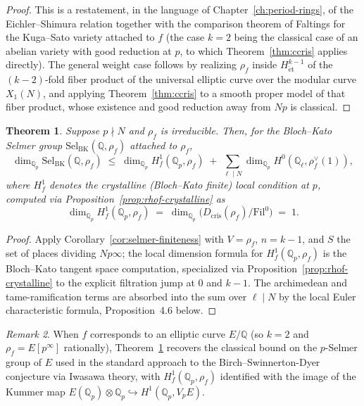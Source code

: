 \documentclass[10pt]{amsbook}
\newtheorem{theorem}{Theorem}[chapter]
\theoremstyle{definition}
\theoremstyle{remark}
\newtheorem{remark}[theorem]{Remark}
\newcommand{\Qp}{\mathbb{Q}_p}
\begin{document}
\begin{proof}
This is a restatement, in the language of Chapter~\ref{ch:period-rings}, of the
Eichler--Shimura relation together with the comparison theorem of Faltings for the Kuga--Sato
variety attached to $f$ (the case $k=2$ being the classical case of an abelian variety with
good reduction at $p$, to which Theorem~\ref{thm:ccris} applies directly). The general weight
case follows by realizing $\rho_f$ inside $H^{k-1}_{\mathrm{\acute et}}$ of the $(k-2)$-fold
fiber product of the universal elliptic curve over the modular curve $X_1(N)$, and applying
Theorem~\ref{thm:ccris} to a smooth proper model of that fiber product, whose existence and
good reduction away from $Np$ is classical.
\end{proof}

\begin{theorem}\label{thm:selmer-bound}
Suppose $p \nmid N$ and $\rho_f$ is irreducible. Then, for the Bloch--Kato Selmer group
$\mathrm{Sel}_{\mathrm{BK}}(\mathbb{Q}, \rho_f)$ attached to $\rho_f$,
\[
  \dim_{\Qp} \mathrm{Sel}_{\mathrm{BK}}(\mathbb{Q}, \rho_f) \;\leq\;
  \dim_{\Qp} H^1_f(\Qp, \rho_f) \; + \; \sum_{\ell \mid N} \dim_{\Qp}
  H^0(\mathbb{Q}_\ell, \rho_f^{\vee}(1)),
\]
where $H^1_f$ denotes the crystalline (Bloch--Kato finite) local condition at $p$, computed
via Proposition~\ref{prop:rhof-crystalline} as
\[
  \dim_{\Qp} H^1_f(\Qp, \rho_f) \;=\; \dim_{\Qp} \bigl(D_{\mathrm{cris}}(\rho_f)/
  \mathrm{Fil}^0\bigr) \;=\; 1.
\]
\end{theorem}

\begin{proof}
Apply Corollary~\ref{cor:selmer-finiteness} with $V = \rho_f$, $n = k-1$, and $S$ the set of
places dividing $Np\infty$; the local dimension formula for $H^1_f(\Qp, \rho_f)$ is the
Bloch--Kato tangent space computation, specialized via Proposition~\ref{prop:rhof-crystalline}
to the explicit filtration jump at $0$ and $k-1$. The archimedean and tame-ramification terms
are absorbed into the sum over $\ell \mid N$ by the local Euler characteristic formula,
Proposition~4.6 below.
\end{proof}

\begin{remark}
When $f$ corresponds to an elliptic curve $E/\mathbb{Q}$ (so $k=2$ and $\rho_f = E[p^\infty]$
rationally), Theorem~\ref{thm:selmer-bound} recovers the classical bound on the $p$-Selmer
group of $E$ used in the standard approach to the Birch--Swinnerton-Dyer conjecture via
Iwasawa theory, with $H^1_f(\Qp, \rho_f)$ identified with the image of the Kummer map
$E(\Qp) \otimes \Qp \hookrightarrow H^1(\Qp, V_p E)$.
\end{remark}
\end{document}
